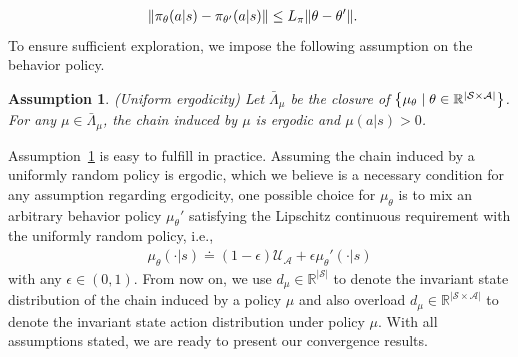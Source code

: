 \documentclass[twoside,11pt]{article}
\newcommand{\fS}{\mathcal{S}}
\newcommand{\fA}{\mathcal{A}}
\newcommand{\fU}{\mathcal{U}}
\newcommand{\R}{\mathbb{R}}
\newcommand{\nsa}{{|\fS \times \fA|}}
\newcommand{\ns}{{|\fS|}}
\newcounter{assucounter}
\numberwithin{assucounter}{section}
\newtheorem{assumption}[assucounter]{Assumption}
\begin{document}
\begin{align}
    \label{eq pi lipschitz}
    \norm{\pi_\theta(a|s) - \pi_{\theta'}(a|s)} &\leq L_\pi \norm{\theta - \theta'}.
\end{align}
To ensure sufficient exploration,
we impose the following assumption on the behavior policy.
\begin{assumption}
  \label{assu mu uniform ergodicity}
  (Uniform ergodicity)
  Let $\bar \Lambda_\mu$ be the closure of $\qty{\mu_\theta \mid \theta \in \R^\nsa}$.
  For any $\mu \in \bar \Lambda_\mu$,
  the chain induced by $\mu$ is ergodic and $\mu(a|s) > 0$.
\end{assumption}
Assumption~\ref{assu mu uniform ergodicity} is easy to fulfill in practice.
Assuming the chain induced by a uniformly random policy is ergodic,
which we believe is a necessary condition for any assumption regarding ergodicity,
one possible choice for $\mu_\theta$ is to mix an arbitrary behavior policy $\mu_\theta'$ satisfying the Lipschitz continuous requirement with the uniformly random policy,
i.e.,
\begin{align}
  \label{eq mu example}
  \mu_\theta(\cdot | s) \doteq (1 - \epsilon) \fU_\fA + \epsilon \mu_\theta'(\cdot | s)
\end{align}
with any $\epsilon \in (0, 1)$.
From now on,
we use $d_{\mu} \in \R^\ns$ to denote the invariant state distribution of the chain induced by a policy $\mu$
and also overload $d_\mu \in \R^\nsa$ to denote the invariant state action distribution under policy $\mu$. 
With all assumptions stated,
we are ready to present our convergence results.
\end{document}
